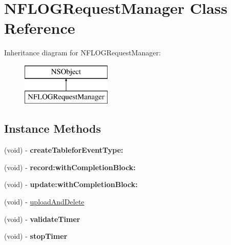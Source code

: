 \hypertarget{interface_n_f_l_o_g_request_manager}{}\section{N\+F\+L\+O\+G\+Request\+Manager Class Reference}
\label{interface_n_f_l_o_g_request_manager}
Inheritance diagram for N\+F\+L\+O\+G\+Request\+Manager\+:\begin{figure}[H]
\begin{center}
\leavevmode
\includegraphics[height=2.000000cm]{interface_n_f_l_o_g_request_manager}
\end{center}
\end{figure}
\subsection*{Instance Methods}
\begin{DoxyCompactItemize}
\item 
\mbox{\label{interface_n_f_l_o_g_request_manager_a2c7a9f7fd9fb53d6a94a585274a6bc4f}} 
(void) -\/ {\bfseries create\+Tablefor\+Event\+Type\+:}
\item 
\mbox{\label{interface_n_f_l_o_g_request_manager_a334b837987a00fcc1a88f0c8002a5916}} 
(void) -\/ {\bfseries record\+:with\+Completion\+Block\+:}
\item 
\mbox{\label{interface_n_f_l_o_g_request_manager_a99a0afcb8645e6dbfa96987c90ad6c1b}} 
(void) -\/ {\bfseries update\+:with\+Completion\+Block\+:}
\item 
(void) -\/ \hyperlink{interface_n_f_l_o_g_request_manager_aa134b2591aa16f5577724d26e53b3eb5}{upload\+And\+Delete}
\item 
\mbox{\label{interface_n_f_l_o_g_request_manager_adbb6382b702a49840494e7ea6f5d724a}} 
(void) -\/ {\bfseries validate\+Timer}
\item 
\mbox{\label{interface_n_f_l_o_g_request_manager_a2a140a361a5b85f7c1ff51f4a60bbab3}} 
(void) -\/ {\bfseries stop\+Timer}
\end{DoxyCompactItemize}
